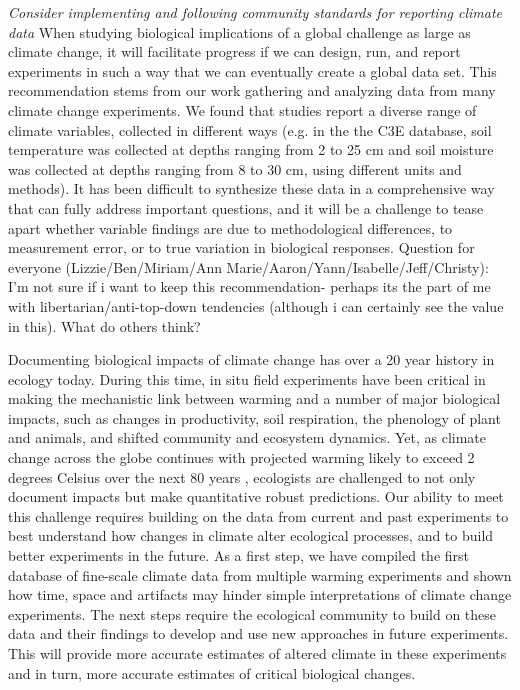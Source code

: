 \documentclass{article}
\begin{document}
\par\textit{Consider implementing and following community standards for reporting climate data} 
When studying biological implications of a global challenge as large as climate change, it will facilitate progress if we can design, run, and report experiments in such a way that we can eventually create a global data set. This recommendation stems from our work gathering and analyzing data from many climate change experiments. We found that studies report a diverse range of climate variables, collected in different ways (e.g. in the the C3E database, soil temperature was collected at depths ranging from 2 to 25 cm and soil moisture was collected at depths ranging from 8 to 30 cm, using different units and methods). It has been difficult to synthesize these data in a comprehensive way that can fully address important questions, and it will be a challenge to tease apart whether variable findings are due to methodological differences, to measurement error, or to true variation in biological responses. Question for everyone (Lizzie/Ben/Miriam/Ann Marie/Aaron/Yann/Isabelle/Jeff/Christy): I'm not sure if i want to keep this recommendation- perhaps its the part of me with libertarian/anti-top-down tendencies (although i can certainly see the value in this). What do others think?

\par Documenting biological impacts of climate change has over a 20 year history in ecology today. During this time, in situ field experiments have been critical in making the mechanistic link between warming and a number of major biological impacts, such as changes in productivity, soil respiration, the phenology of plant and animals, and shifted community and ecosystem dynamics. Yet, as climate change across the globe continues with projected warming likely to exceed 2 degrees Celsius over the next 80 years \citep{ipcc2013}, ecologists are challenged to not only document impacts but make quantitative robust predictions. Our ability to meet this challenge requires building on the data from current and past experiments to best understand how changes in climate alter ecological processes, and to build better experiments in the future. As a first step, we have compiled the first database of fine-scale climate data from multiple warming experiments and shown how time, space and artifacts may hinder simple interpretations of climate change experiments. The next steps require the ecological community to build on these data and their findings to develop and use new approaches in future experiments. This will provide more accurate estimates of altered climate in these experiments and in turn, more accurate estimates of critical biological changes. 
\end{document}
